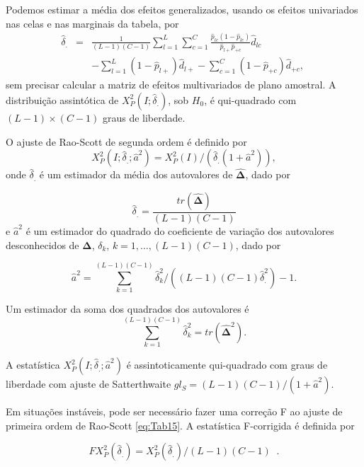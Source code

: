 \documentclass[]{book}
\theoremstyle{definition}
\theoremstyle{definition}
\theoremstyle{definition}
\theoremstyle{remark}
\begin{document}
Podemos estimar a média dos efeitos generalizados, usando os efeitos
univariados nas celas e nas marginais da tabela, por \[
\begin{array}{lll}
\hat{\delta}_{.} & = & \frac{1}{\left( L-1\right) \left( C-1\right) }
\sum\limits_{l=1}^{L}\sum\limits_{c=1}^{C}\frac{\hat{p}_{lc}\left( 1-\hat{p}
_{lc}\right) }{\hat{p}_{l+}\hat{p}_{+c}}\hat{d}_{lc} \\ 
&  & -\sum\limits_{l=1}^{L}\left( 1-\hat{p}_{l+}\right) \hat{d}
_{l+}-\sum\limits_{c=1}^{C}\left( 1-\hat{p}_{+c}\right) \hat{d}_{+c},
\end{array}
\;
\] sem precisar calcular a matriz de efeitos multivariados de plano
amostral. A distribuição assintótica de
\(X_{P}^{2}\left( I;\hat{\delta} _{.}\right)\), sob \(H_{0}\), é
qui-quadrado com \(\left( L-1\right) \times \left( C-1\right)\) graus de
liberdade.

O ajuste de Rao-Scott de segunda ordem é definido por \[
X_{P}^{2}\left( I;\hat{\delta}_{.};\hat{a}^{2}\right) =X_{P}^{2}\left(
I\right) /\left( \hat{\delta}_{.}\left( 1+\hat{a}^{2}\right) \right), 
\] onde \(\hat{\delta}_{.}\) é um estimador da média dos autovalores de
\(\mathbf{\hat{\Delta}}\), dado por

\[
\hat{\delta}_{.}=\frac{tr\left( \mathbf{\hat{\Delta}}\right) }{\left(
L-1\right) \left( C-1\right) } 
\] e \(\hat{a}^{2}\) é um estimador do quadrado do coeficiente de
variação dos autovalores desconhecidos de \(\mathbf{\Delta}\),
\(\delta _{k}\), \(k=1,\ldots ,\left( L-1\right) \left( C-1\right)\),
dado por

\[
\hat{a}^{2}=\sum\limits_{k=1}^{\left( L-1\right) \left( C-1\right) }\hat{
\delta}_{k}^{2}/\left( \left( L-1\right) \left( C-1\right) \hat{\delta}
_{.}^{2}\right) -1. 
\]

Um estimador da soma dos quadrados dos autovalores é \[
\sum\limits_{k=1}^{\left( L-1\right) \left( C-1\right) }\hat{\delta}
_{k}^{2}=tr\left( \mathbf{\hat{\Delta}}^{2}\right).
\]

A estatística \(X_{P}^{2}\left( I;\hat{\delta}_{.};\hat{a}^{2}\right)\)
é assintoticamente qui-quadrado com graus de liberdade com ajuste de
Satterthwaite
\(gl_{S}=\left( L-1\right) \left( C-1\right) /\left( 1+\hat{a} ^{2}\right) .\)

Em situações instáveis, pode ser necessário fazer uma correção F ao
ajuste de primeira ordem de Rao-Scott \eqref{eq:Tab15}. A estatística
F-corrigida é definida por

\begin{equation}
FX_{P}^{2}\left( \hat{\delta}_{.}\right) =X_{P}^{2}\left( \hat{\delta}
_{.}\right) /\left( L-1\right) \left( C-1\right) \;\;.  \label{eq:Tab16}
\end{equation}
\end{document}
